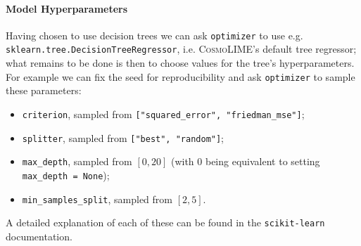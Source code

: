\paragraph{Model Hyperparameters}
Having chosen to use decision trees we can ask \texttt{optimizer} to use e.g. \texttt{sklearn.tree.DecisionTreeRegressor}, i.e. \textsc{CosmoLIME}'s default tree regressor; what remains to be done is then to choose values for the tree's hyperparameters. For example we can fix the seed for reproducibility and ask \texttt{optimizer} to sample these parameters:
\begin{itemize}
    \item \texttt{criterion}, sampled from \texttt{["squared\_error", "friedman\_mse"]};
    \item \texttt{splitter}, sampled from \texttt{["best", "random"]};
    \item \texttt{max\_depth}, sampled from $[0, 20]$ (with $0$ being equivalent to setting \texttt{max\_depth = None});
    \item \texttt{min\_samples\_split}, sampled from $[2, 5]$.
\end{itemize}
A detailed explanation of each of these can be found in the \texttt{scikit-learn} documentation.

